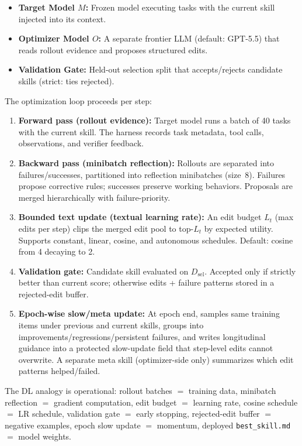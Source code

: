 \documentclass[11pt,a4paper]{article}
\begin{document}
\begin{itemize}[nosep]
    \item \textbf{Target Model $M$:} Frozen model executing tasks with the current skill injected into its context.
    \item \textbf{Optimizer Model $O$:} A separate frontier LLM (default: GPT-5.5) that reads rollout evidence and proposes structured edits.
    \item \textbf{Validation Gate:} Held-out selection split that accepts/rejects candidate skills (strict: ties rejected).
\end{itemize}

The optimization loop proceeds per step:
\begin{enumerate}[nosep]
    \item \textbf{Forward pass (rollout evidence):} Target model runs a batch of 40 tasks with the current skill. The harness records task metadata, tool calls, observations, and verifier feedback.
    \item \textbf{Backward pass (minibatch reflection):} Rollouts are separated into failures/successes, partitioned into reflection minibatches (size~8). Failures propose corrective rules; successes preserve working behaviors. Proposals are merged hierarchically with failure-priority.
    \item \textbf{Bounded text update (textual learning rate):} An edit budget $L_t$ (max edits per step) clips the merged edit pool to top-$L_t$ by expected utility. Supports constant, linear, cosine, and autonomous schedules. Default: cosine from 4 decaying to 2.
    \item \textbf{Validation gate:} Candidate skill evaluated on $D_{\mathrm{sel}}$. Accepted only if strictly better than current score; otherwise edits + failure patterns stored in a rejected-edit buffer.
    \item \textbf{Epoch-wise slow/meta update:} At epoch end, samples same training items under previous and current skills, groups into improvements/regressions/persistent failures, and writes longitudinal guidance into a protected slow-update field that step-level edits cannot overwrite. A separate meta skill (optimizer-side only) summarizes which edit patterns helped/failed.
\end{enumerate}

The DL analogy is operational: rollout batches $=$ training data, minibatch reflection $=$ gradient computation, edit budget $=$ learning rate, cosine schedule $=$ LR schedule, validation gate $=$ early stopping, rejected-edit buffer $=$ negative examples, epoch slow update $=$ momentum, deployed \texttt{best\_skill.md} $=$ model weights.
\end{document}
